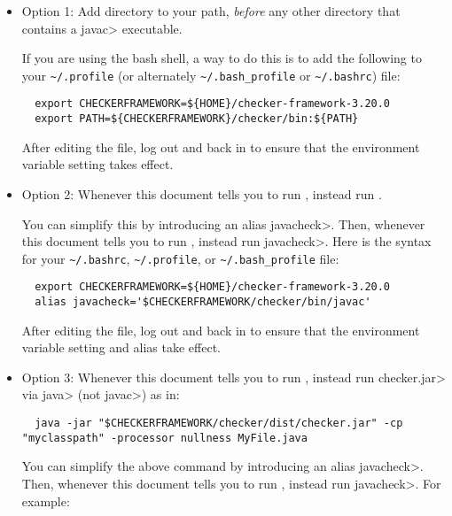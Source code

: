\begin{itemize}
  \item
    Option 1:
    Add directory
     to your path, \emph{before} any other
    directory that contains a \<javac> executable.

    If you are
    using the bash shell, a way to do this is to add the following to your
    \verb|~/.profile| (or alternately \verb|~/.bash_profile| or \verb|~/.bashrc|) file:
\begin{Verbatim}
  export CHECKERFRAMEWORK=${HOME}/checker-framework-3.20.0
  export PATH=${CHECKERFRAMEWORK}/checker/bin:${PATH}
\end{Verbatim}

   After editing the file, log out and back in to ensure that the environment variable
   setting takes effect.

  \item
    \begin{sloppypar}
    Option 2:
    Whenever this document tells you to run ,
    instead run .
    \end{sloppypar}

    You can simplify this by introducing an alias \<javacheck>.  Then,
    whenever this document tells you to run , instead run
    \<javacheck>.  Here is the syntax for your
    \verb|~/.bashrc|, \verb|~/.profile|, or \verb|~/.bash_profile|
    file:
\begin{Verbatim}
  export CHECKERFRAMEWORK=${HOME}/checker-framework-3.20.0
  alias javacheck='$CHECKERFRAMEWORK/checker/bin/javac'
\end{Verbatim}

   After editing the file, log out and back in to ensure that the environment variable
   setting and alias take effect.

   \item
   Option 3:
   Whenever this document tells you to run , instead
   run \<checker.jar> via \<java> (not \<javac>) as in:

\begin{Verbatim}
  java -jar "$CHECKERFRAMEWORK/checker/dist/checker.jar" -cp "myclasspath" -processor nullness MyFile.java
\end{Verbatim}

    You can simplify the above command by introducing an alias
    \<javacheck>.  Then, whenever this document tells you to run
    , instead run \<javacheck>.  For example:


\end{itemize}
